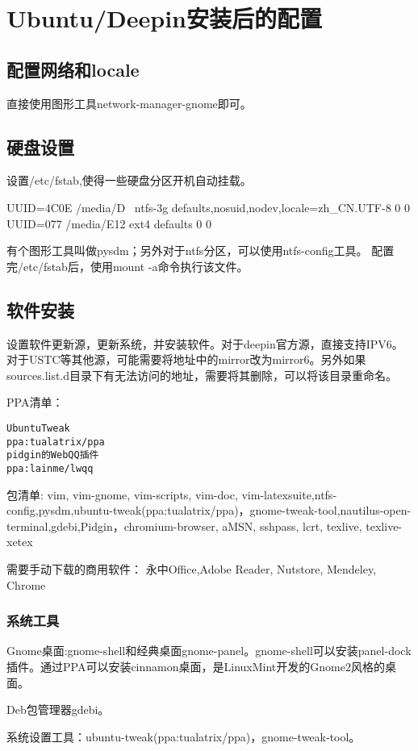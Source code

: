 \section{Ubuntu/Deepin安装后的配置}

\subsection{配置网络和locale}
直接使用图形工具network-manager-gnome即可。

\subsection{硬盘设置}
设置/etc/fstab,使得一些硬盘分区开机自动挂载。
\begin{shellcmd}
UUID=4C0E	/media/D \	
ntfs-3g	defaults,nosuid,nodev,locale=zh_CN.UTF-8	0	0
UUID=077  /media/E12	ext4	defaults	0	0
\end{shellcmd}
有个图形工具叫做pysdm；另外对于ntfs分区，可以使用ntfs-config工具。
配置完/etc/fstab后，使用mount -a命令执行该文件。

\subsection{软件安装}
设置软件更新源，更新系统，并安装软件。对于deepin官方源，直接支持IPV6。对于USTC等其他源，可能需要将地址中的mirror改为mirror6。另外如果sources.list.d目录下有无法访问的地址，需要将其删除，可以将该目录重命名。

PPA清单：
\begin{verbatim}
UbuntuTweak
ppa:tualatrix/ppa
pidgin的WebQQ插件
ppa:lainme/lwqq
\end{verbatim}

包清单:
vim, vim-gnome, vim-scripts, vim-doc, vim-latexsuite,ntfs-config,pysdm,ubuntu-tweak(ppa:tualatrix/ppa)，gnome-tweak-tool,nautilus-open-terminal,gdebi,Pidgin，chromium-browser, aMSN, sshpass, lcrt, texlive, texlive-xetex

需要手动下载的商用软件：
永中Office,Adobe Reader, Nutstore, Mendeley, Chrome

\subsubsection{系统工具}
Gnome桌面:gnome-shell和经典桌面gnome-panel。gnome-shell可以安装panel-dock插件。通过PPA可以安装cinnamon桌面，是LinuxMint开发的Gnome2风格的桌面。

Deb包管理器gdebi。

系统设置工具：ubuntu-tweak(ppa:tualatrix/ppa)，gnome-tweak-tool。


